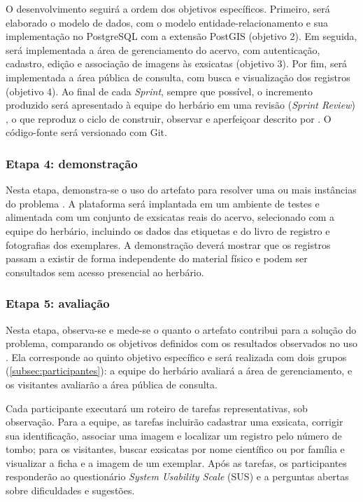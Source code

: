\documentclass[
    12pt,        %
    openany,     %
    oneside,     %
    a4paper,     %
    english,     %
    french,      %
    spanish,     %
    brazil,      %
    article      %
]{abntex2}
\begin{document}
O desenvolvimento seguirá a ordem dos objetivos específicos. Primeiro, será elaborado o modelo de dados, com o modelo entidade-relacionamento e sua implementação no PostgreSQL com a extensão PostGIS (objetivo 2). Em seguida, será implementada a área de gerenciamento do acervo, com autenticação, cadastro, edição e associação de imagens às exsicatas (objetivo 3). Por fim, será implementada a área pública de consulta, com busca e visualização dos registros (objetivo 4). Ao final de cada \textit{Sprint}, sempre que possível, o incremento produzido será apresentado à equipe do herbário em uma revisão (\textit{Sprint Review}) \cite{schwaber2020scrum}, o que reproduz o ciclo de construir, observar e aperfeiçoar descrito por . O código-fonte será versionado com Git.

\subsubsection{Etapa 4: demonstração}
\label{subsubsec:etapa4}

Nesta etapa, demonstra-se o uso do artefato para resolver uma ou mais instâncias do problema \cite{peffers2007dsrm}. A plataforma será implantada em um ambiente de testes e alimentada com um conjunto de exsicatas reais do acervo, selecionado com a equipe do herbário, incluindo os dados das etiquetas e do livro de registro e fotografias dos exemplares. A demonstração deverá mostrar que os registros passam a existir de forma independente do material físico e podem ser consultados sem acesso presencial ao herbário.

\subsubsection{Etapa 5: avaliação}
\label{subsubsec:etapa5}

Nesta etapa, observa-se e mede-se o quanto o artefato contribui para a solução do problema, comparando os objetivos definidos com os resultados observados no uso \cite{peffers2007dsrm}. Ela corresponde ao quinto objetivo específico e será realizada com dois grupos (\autoref{subsec:participantes}): a equipe do herbário avaliará a área de gerenciamento, e os visitantes avaliarão a área pública de consulta.

Cada participante executará um roteiro de tarefas representativas, sob observação. Para a equipe, as tarefas incluirão cadastrar uma exsicata, corrigir sua identificação, associar uma imagem e localizar um registro pelo número de tombo; para os visitantes, buscar exsicatas por nome científico ou por família e visualizar a ficha e a imagem de um exemplar. Após as tarefas, os participantes responderão ao questionário \textit{System Usability Scale} (SUS) \cite{brooke1996sus} e a perguntas abertas sobre dificuldades e sugestões.
\end{document}
